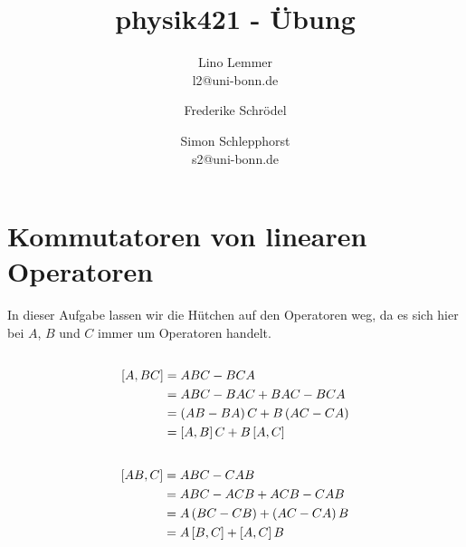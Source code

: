 

\setcounter{thezettel}{6}
\renewcommand\thesection{\arabic{thezettel}.\arabic{section}}

\newcommand\ccancel[2][black]{\renewcommand\CancelColor{\color{#1}}\cancel{#2}}


\title{physik421 - Übung }
\author{Lino Lemmer \\ \small{l2@uni-bonn.de} \and Frederike Schrödel \and Simon Schlepphorst\\ \small{s2@uni-bonn.de}}


\maketitle

\section{Kommutatoren von linearen Operatoren}

In dieser Aufgabe lassen wir die Hütchen auf den Operatoren weg, da es sich
hier bei $A$, $B$ und $C$ immer um Operatoren handelt.

\subsection{}

\begin{align*}
    \sbr{A,BC} &= ABC - BCA \\
               &= ABC - BAC + BAC -BCA \\
               &= \del{AB - BA}C + B\del{AC - CA} \\
               &= \sbr{A,B}C + B\sbr{A,C}
\end{align*}

\subsection{}

\begin{align*}
    \sbr{AB,C} &= ABC - CAB \\
               &= ABC - ACB + ACB - CAB \\
               &= A\del{BC-CB} + \del{AC-CA}B \\
               &= A\sbr{B,C} + \sbr{A,C}B
\end{align*}

\subsection{}

